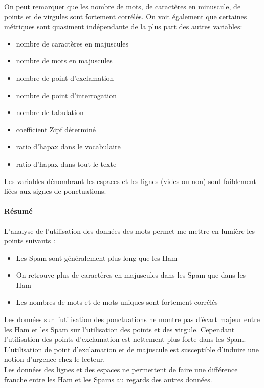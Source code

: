 \documentclass[a4paper,12pt]{article}
\begin{document}
				On peut remarquer que les nombre de mots, de caractères en minuscule, de points et de virgules sont fortement corrélés.
				On voit également que certaines métriques sont quasiment indépendante de la plus part des autres variables:
				\begin{itemize}
					\item nombre de caractères en majuscules
					\item nombre de mots en majuscules
					\item nombre de point d'exclamation
					\item nombre de point d'interrogation
					\item nombre de tabulation
					\item coefficient Zipf déterminé
					\item ratio d'hapax dans le vocabulaire
					\item ratio d'hapax dans tout le texte
				\end{itemize}
				
				Les variables dénombrant les espaces et les lignes (vides ou non) sont faiblement liées aux signes de ponctuations.
			
			
			\paragraph{Résumé} L'analyse de l'utilisation des données des mots permet me mettre en lumière les points suivants :
			\begin{itemize}
				\item Les Spam sont généralement plus long que les Ham
				\item On retrouve plus de caractères en majuscules dans les Spam que dans les Ham
				\item Les nombres de mots et de mots uniques sont fortement corrélés
			\end{itemize}
			
			Les données sur l'utilisation des ponctuations ne montre pas d'écart majeur entre les Ham et les Spam sur l'utilisation des points et des virgule. Cependant l'utilisation des points d'exclamation est nettement plus forte dans les Spam. \\
			L'utilisation de point d'exclamation et de majuscule est susceptible d'induire une notion d'urgence chez le lecteur.\\
			
			Les données des lignes et des espaces ne permettent de faire une différence franche entre les Ham et les Spams au regards des autres données.\\ 
			
\end{document}
